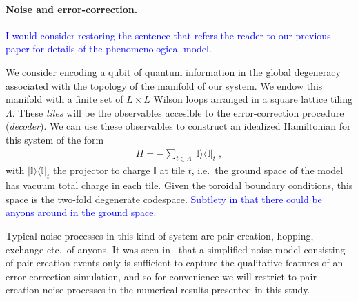 \documentclass[aps, prl, letterpaper, twocolumn, superscriptaddress, notitlepage, 10pt]{revtex4}
\newcommand{\vac}{\mathbb{I}}
\newcommand{\ket}[1]{|{#1}\rangle}
\newcommand{\bra}[1]{\langle{#1}|}
\newcommand{\ketbra}[2]{\ket{#1}\!\bra{#2}}
\newcommand{\proj}[1]{\ketbra{#1}{#1}}
\newcommand{\cggb}[1]{\textcolor{blue}{#1}}
\begin{document}
\paragraph{Noise and error-correction.}

\cggb{I would consider restoring the sentence that refers the reader to our previous paper for details of the phenomenological model.}

We consider encoding a qubit of quantum information in the global degeneracy associated 
with the topology of the manifold of our system.
We endow this manifold with a finite set of $L\times L$ Wilson loops arranged in
a square lattice tiling $\Lambda$.
These \emph{tiles} will be the observables accesible to the error-correction procedure (\emph{decoder}).
We can use these observables to construct an idealized Hamiltonian for this system of the form
\begin{align}
	H=-\sum_{t\in \Lambda}\proj{\vac}_t\;,\label{e:hamiltonian}
\end{align}
with $\proj{\vac}_t$ the projector to charge $\vac$ at tile $t$, i.e.~the ground 
space of the model has vacuum total charge in each tile.
Given the toroidal boundary 
conditions, this space is the two-fold degenerate codespace. \cggb{Subtlety in that there could be anyons around in the ground space.}

Typical noise processes in this kind of system are 
pair-creation, hopping, exchange etc.~of anyons.
It was seen in~\cite{Brell2013} that a simplified noise model consisting of pair-creation events only 
is sufficient to capture the qualitative features of an error-correction simulation, and so for convenience we 
will restrict to pair-creation noise processes in the numerical results presented in this study. 
\end{document}
